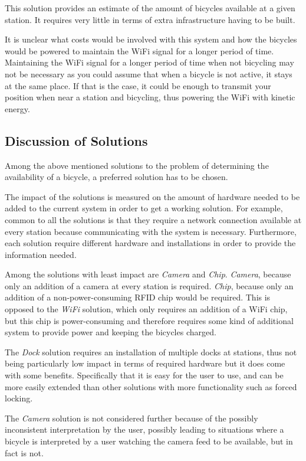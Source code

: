 This solution provides an estimate of the amount of bicycles available at a given station.
It requires very little in terms of extra infrastructure having to be built.

It is unclear what costs would be involved with this system and how the bicycles would be powered to maintain the WiFi signal for a longer period of time. 
Maintaining the WiFi signal for a longer period of time when not bicycling may not be necessary as you could assume that when a bicycle is not active, it stays at the same place.
If that is the case, it could be enough to transmit your position when near a station and bicycling, thus powering the WiFi with kinetic energy.

\subsection{Discussion of Solutions}
Among the above mentioned solutions to the problem of determining the availability of a bicycle, a preferred solution has to be chosen. 

The impact of the solutions is measured on the amount of hardware needed to be added to the current system in order to get a working solution. 
For example, common to all the solutions is that they require a network connection available at every station because communicating with the system is necessary. 
Furthermore, each solution require different hardware and installations in order to provide the information needed. 

Among the solutions with least impact are \textit{Camera} and \textit{Chip}. 
\textit{Camera}, because only an addition of a camera at every station is required. 
\textit{Chip}, because only an addition of a non-power-consuming RFID chip would be required.
This is opposed to the \textit{WiFi} solution, which only requires an addition of a WiFi chip, but this chip is power-consuming and therefore requires some kind of additional system to provide power and keeping the bicycles charged.

The \textit{Dock} solution requires an installation of multiple docks at stations, thus not being particularly low impact in terms of required hardware but it does come with some benefits.
Specifically that it is easy for the user to use, and can be more easily extended than other solutions with more functionality such as forced locking.

The \textit{Camera} solution is not considered further because of the possibly inconsistent interpretation by the user, possibly leading to situations where a bicycle is interpreted by a user watching the camera feed to be available, but in fact is not.


